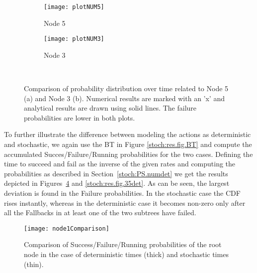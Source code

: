 \begin{figure}[h]
\centering
        \begin{subfigure}[h]{0.8\columnwidth}
                \texttt{[image: plotNUM5]}
                \caption{Node 5}
                \vspace{0.3cm}
                \label{stoch:res.fig.5}
        \end{subfigure}
        \begin{subfigure}[h]{0.8\columnwidth}
                \texttt{[image: plotNUM3]}
                \caption{Node 3}   
                \label{stoch:res.fig.3}           
        \end{subfigure}
        ~ %
        \caption{Comparison of probability distribution over time related to  Node 5 (a) and Node 3 (b).
        Numerical results are marked with an 'x' and analytical results are drawn using solid lines. The failure probabilities are lower in both plots.}
        \label{stoch:res.fig.35}
\end{figure}

To further illustrate the difference between modeling the actions as deterministic and stochastic,
we again use the BT in Figure \ref{stoch:res.fig.BT} and
compute the
 accumulated Succes/Failure/Running probabilities for the two cases.
Defining the time to succeed and fail as the inverse of the given rates and computing the probabilities as described in Section~\ref{stoch:PS.numdet}
we get the results depicted in 
 Figures~\ref{stoch:res.fig.comparisondet} and \ref{stoch:res.fig.35det}.   
 As can be seen, the largest deviation is found in the Failure probabilities. In the stochastic case the CDF rises instantly, whereas in the deterministic case it becomes non-zero only after all the Fallbacks in at least one of the two subtrees have failed. 

\begin{figure}[!h]
\centering
\texttt{[image: node1Comparison]}
\caption{Comparison of Success/Failure/Running probabilities of the root node in the case of deterministic times (thick) and stochastic times (thin). }
\label{stoch:res.fig.comparisondet}
\end{figure}



